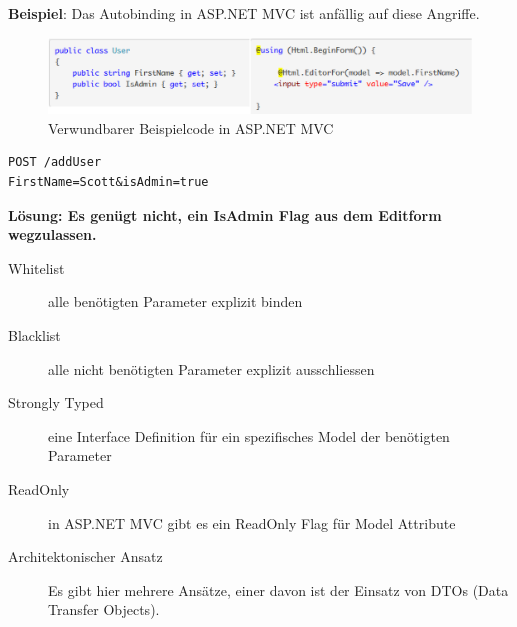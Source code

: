 \textbf{Beispiel}: Das Autobinding in ASP.NET MVC ist anfällig auf diese Angriffe.
\begin{figure}[H]
	\centering
	\includegraphics[width=\textwidth]{./img/mass-assignment-vulnerability}
	\caption{Verwundbarer Beispielcode in ASP.NET MVC}
\end{figure}
\begin{lstlisting}[language={},caption=Beispiel eines präparierten Requests zum Setzen eines nicht vorgesehenen Parameters]
POST /addUser
FirstName=Scott&isAdmin=true
\end{lstlisting}

\textbf{Lösung: Es genügt nicht, ein IsAdmin Flag aus dem Editform wegzulassen.}

\begin{description}
	\item[Whitelist] alle benötigten Parameter explizit binden
	\item[Blacklist] alle nicht benötigten Parameter explizit ausschliessen
	\item[Strongly Typed] eine Interface Definition für ein spezifisches Model der benötigten Parameter
	\item[ReadOnly] in ASP.NET MVC gibt es ein ReadOnly Flag für Model Attribute
	\item[Architektonischer Ansatz] Es gibt hier mehrere Ansätze, einer davon ist der Einsatz von DTOs (Data Transfer Objects).
\end{description}
